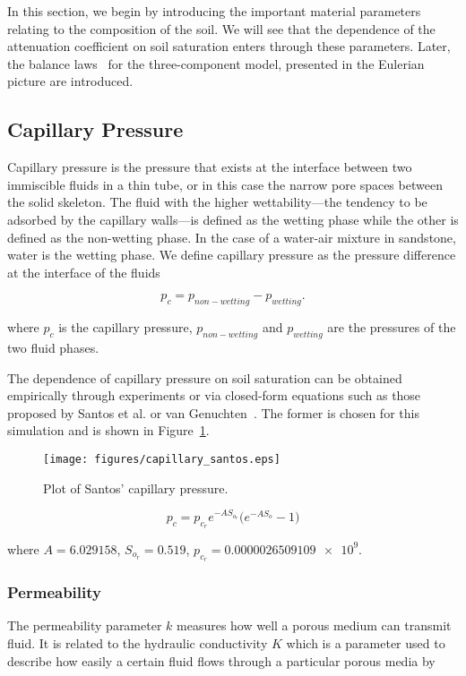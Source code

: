 \documentclass[twocolumn]{article}
\begin{document}
In this section, we begin by introducing the important material parameters relating to the composition of the soil. We will see that the dependence of the attenuation coefficient on soil saturation enters through these parameters. Later, the balance laws~\cite{jog_2015} for the three-component model, presented in the Eulerian picture are introduced.

\subsection{Capillary Pressure}
Capillary pressure is the pressure that exists at the interface between two immiscible fluids in a thin tube, or in this case the narrow pore spaces between the solid skeleton. The fluid with the higher wettability---the tendency to be adsorbed by the capillary walls---is defined as the wetting phase while the other is defined as the non-wetting phase. In the case of a water-air mixture in sandstone, water is the wetting phase. We define capillary pressure as the pressure difference at the interface of the fluids

\begin{equation} \label{eq:capillary-def}
    p_c= p_{non-wetting} - p_{wetting}.
\end{equation}

where $p_c$ is the capillary pressure, $p_{non-wetting}$ and $p_{wetting}$ are the pressures of the two fluid phases.

The dependence of capillary pressure on soil saturation can be obtained empirically through experiments or via closed-form equations such as those proposed by Santos et al. or van Genuchten~\cite{van_genuchten_1980}. The former is chosen for this simulation and is shown in Figure~\ref{fig:capillary_santos}.

\begin{figure}
    \centering
    \texttt{[image: figures/capillary\_santos.eps]}
    \caption{Plot of Santos' capillary pressure.}
    \label{fig:capillary_santos}
\end{figure}

\begin{equation*}
    p_c = p_{c_r}e^{-AS_{o_r}}\bigl(e^{-AS_o} - 1\bigr)
\end{equation*}

where $A = \num{6.029158}$, $S_{o_r} = \num{0.519}$, $p_{c_r}=\num{0.0000026509109e9}$.

\subsubsection{Permeability}
The permeability parameter $k$ measures how well a porous medium can transmit fluid. It is related to the hydraulic conductivity $K$ which is a parameter used to describe how easily a certain fluid flows through a particular porous media by
\end{document}
